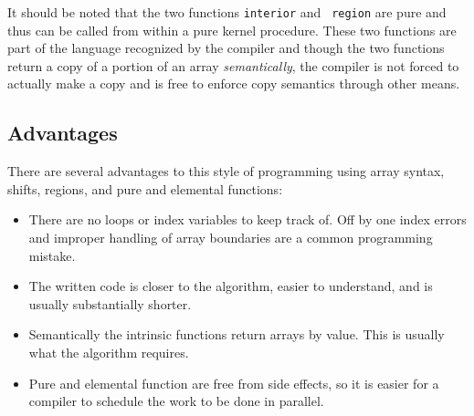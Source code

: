 It should be noted that the two functions {\tt interior} and {\tt
  region} are pure and thus can be called from within a pure kernel
procedure.  These two functions are part of the language recognized by
the compiler and though the two functions return a copy of a portion
of an array \emph{semantically}, the compiler is not forced to
actually make a copy and is free to enforce copy semantics through
other means.

\subsection{Advantages}

There are several advantages to this style of programming using array
syntax, shifts, regions, and pure and elemental functions:

\begin{itemize}
\item There are no loops or index variables to keep track of.  Off by
  one index errors and improper handling of array boundaries are a
  common programming mistake.
\item The written code is closer to the algorithm, easier to
  understand, and is usually substantially shorter.
\item Semantically the intrinsic functions return arrays by value.
  This is usually what the algorithm requires.
\item Pure and elemental function are free from side effects, so it is
  easier for a compiler to schedule the work to be done in parallel.
\end{itemize}


%




